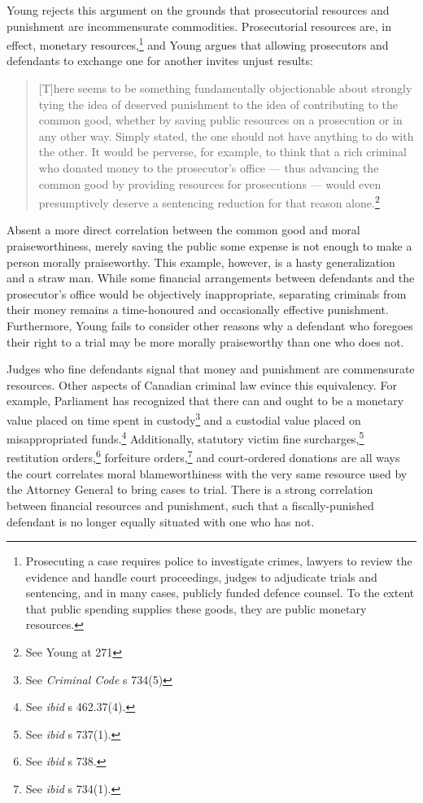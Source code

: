 Young rejects this argument on the grounds that prosecutorial resources and punishment are incommensurate commodities. Prosecutorial resources are, in effect, monetary resources,\footnote{Prosecuting a case requires police to investigate crimes, lawyers to review the evidence and handle court proceedings, judges to adjudicate trials and sentencing, and in many cases, publicly funded defence counsel. To the extent that public spending supplies these goods, they are public monetary resources.} and Young argues that allowing prosecutors and defendants to exchange one for another invites unjust results:

\begin{quote}
    \begin{singlespace}
    
    [T]here seems to be something fundamentally objectionable about strongly tying the idea of deserved punishment to the idea of contributing to the common good, whether by saving public resources on a prosecution or in any other way. Simply stated, the one should not have anything to do with the other. It would be perverse, for example, to think that a rich criminal who donated money to the prosecutor's office — thus advancing the common good by providing resources for prosecutions — would even presumptively deserve a sentencing reduction for that reason alone.\footnote{See Young at 271}
    \end{singlespace}
\end{quote}

Absent a more direct correlation between the common good and moral praiseworthiness, merely saving the public some expense is not enough to make a person morally praiseworthy. This example, however, is a hasty generalization and a straw man. While some financial arrangements between defendants and the prosecutor's office would be objectively inappropriate, separating criminals from their money remains a time-honoured and occasionally effective punishment. Furthermore, Young fails to consider other reasons why a defendant who foregoes their right to a trial may be more morally praiseworthy than one who does not.

Judges who fine defendants signal that money and punishment are commensurate resources. Other aspects of Canadian criminal law evince this equivalency. For example, Parliament has recognized that there can and ought to be a monetary value placed on time spent in custody\footnote{See \textit{Criminal Code} s 734(5)} and a custodial value placed on misappropriated funds.\footnote{See \textit{ibid} s 462.37(4).} Additionally, statutory victim fine surcharges,\footnote{See \textit{ibid} s 737(1).} restitution orders,\footnote{See \textit{ibid} s 738.} forfeiture orders,\footnote{See \textit{ibid} s 734(1).} and court-ordered donations are all ways the court correlates moral blameworthiness with the very same resource used by the Attorney General to bring cases to trial. There is a strong correlation between financial resources and punishment, such that a fiscally-punished defendant is no longer equally situated with one who has not.

